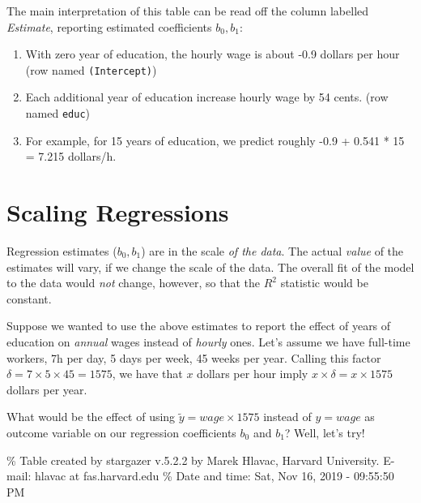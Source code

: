 \documentclass[]{book}
\providecommand{\tightlist}{%
  \setlength{\itemsep}{0pt}\setlength{\parskip}{0pt}}
\newenvironment{tip}{\begin{tcolorbox}[colback=green!5!white,colframe=green]}{\end{tcolorbox}}
\begin{document}
The main interpretation of this table can be read off the column
labelled \emph{Estimate}, reporting estimated coefficients \(b_0,b_1\):

\begin{enumerate}
\def\labelenumi{\arabic{enumi}.}
\tightlist
\item
  With zero year of education, the hourly wage is about -0.9 dollars per
  hour (row named \texttt{(Intercept)})
\item
  Each additional year of education increase hourly wage by 54 cents.
  (row named \texttt{educ})
\item
  For example, for 15 years of education, we predict roughly -0.9 +
  0.541 * 15 = 7.215 dollars/h.
\end{enumerate}

\section{Scaling Regressions}\label{scaling-regressions}

\begin{tip}
Regression estimates (\(b_0, b_1\)) are in the scale \emph{of the data}.
The actual \emph{value} of the estimates will vary, if we change the
scale of the data. The overall fit of the model to the data would
\emph{not} change, however, so that the \(R^2\) statistic would be
constant.
\end{tip}

Suppose we wanted to use the above estimates to report the effect of
years of education on \emph{annual} wages instead of \emph{hourly} ones.
Let's assume we have full-time workers, 7h per day, 5 days per week, 45
weeks per year. Calling this factor
\(\delta = 7 \times 5 \times 45 = 1575\), we have that \(x\) dollars per
hour imply \(x \times \delta = x \times 1575\) dollars per year.

What would be the effect of using \(\tilde{y} = wage \times 1575\)
instead of \(y = wage\) as outcome variable on our regression
coefficients \(b_0\) and \(b_1\)? Well, let's try!

\% Table created by stargazer v.5.2.2 by Marek Hlavac, Harvard
University. E-mail: hlavac at fas.harvard.edu \% Date and time: Sat, Nov
16, 2019 - 09:55:50 PM
\end{document}
